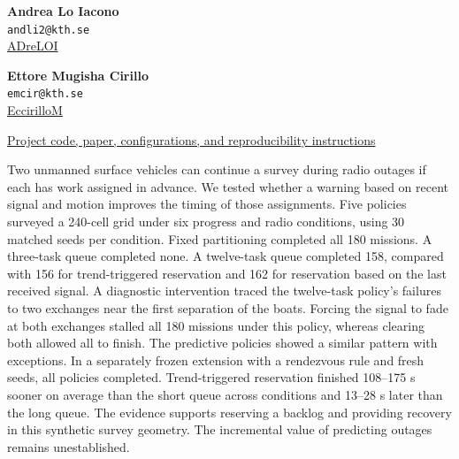 \noindent\begin{minipage}[t]{0.48\linewidth}\centering
\textbf{Andrea Lo Iacono}\\\texttt{andli2@kth.se}\\
\href{https://github.com/ADreLOI}{\faGithubSquare\hspace{0.13cm}ADreLOI}
\end{minipage}\hfill
\begin{minipage}[t]{0.48\linewidth}\centering
\textbf{Ettore Mugisha Cirillo}\\\texttt{emcir@kth.se}\\
\href{https://github.com/EccirilloM}{\faGithubSquare\hspace{0.13cm}EccirilloM}
\end{minipage}
\begin{mdframed}[linecolor=guidancetext,linewidth=0.5pt,roundcorner=3pt]
\centering\href{https://github.com/ADreLOI/RMSW-Project}{\faGithubSquare\hspace{0.15cm}Project code, paper, configurations, and reproducibility instructions}
\end{mdframed}
Two unmanned surface vehicles can continue a survey during radio outages if each has work assigned in advance. We tested whether a warning based on recent signal and motion improves the timing of those assignments. Five policies surveyed a 240-cell grid under six progress and radio conditions, using 30 matched seeds per condition. Fixed partitioning completed all 180 missions. A three-task queue completed none. A twelve-task queue completed 158, compared with 156 for trend-triggered reservation and 162 for reservation based on the last received signal. A diagnostic intervention traced the twelve-task policy's failures to two exchanges near the first separation of the boats. Forcing the signal to fade at both exchanges stalled all 180 missions under this policy, whereas clearing both allowed all to finish. The predictive policies showed a similar pattern with exceptions. In a separately frozen extension with a rendezvous rule and fresh seeds, all policies completed. Trend-triggered reservation finished 108--175 s sooner on average than the short queue across conditions and 13--28 s later than the long queue. The evidence supports reserving a backlog and providing recovery in this synthetic survey geometry. The incremental value of predicting outages remains unestablished.
